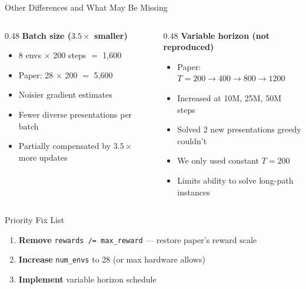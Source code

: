 \documentclass[aspectratio=169,11pt]{beamer}
\begin{document}
\begin{frame}{Other Differences and What May Be Missing}
  \begin{columns}[T]
    \begin{column}{0.48\textwidth}
      \textbf{Batch size ($3.5\times$ smaller)}
      \begin{itemize}\small
        \item 8 envs $\times$ 200 steps $=$ 1{,}600
        \item Paper: 28 $\times$ 200 $=$ 5{,}600
        \item Noisier gradient estimates
        \item Fewer diverse presentations per batch
        \item Partially compensated by $3.5\times$ more updates
      \end{itemize}
    \end{column}
    \begin{column}{0.48\textwidth}
      \textbf{Variable horizon (not reproduced)}
      \begin{itemize}\small
        \item Paper: $T = 200 \to 400 \to 800 \to 1200$
        \item Increased at 10M, 25M, 50M steps
        \item Solved 2 new presentations greedy couldn't
        \item We only used constant $T = 200$
        \item Limits ability to solve long-path instances
      \end{itemize}
    \end{column}
  \end{columns}

  \bigskip
  \begin{block}{Priority Fix List}
    \begin{enumerate}\small
      \item \textbf{Remove} \texttt{rewards /= max\_reward} --- restore paper's reward scale
      \item \textbf{Increase} \texttt{num\_envs} to 28 (or max hardware allows)
      \item \textbf{Implement} variable horizon schedule
    \end{enumerate}
  \end{block}
\end{frame}
\end{document}
